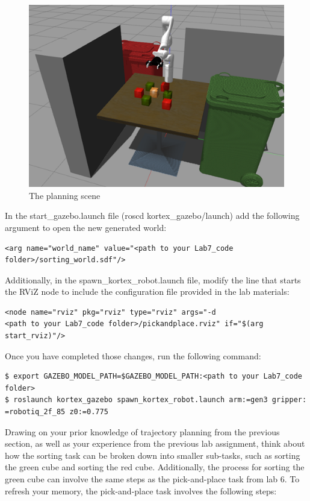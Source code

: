 \documentclass[12pt]{article}
\begin{document}
\begin{figure}[H]
    \vspace{-10pt}
    \centering\includegraphics[width=12cm]{images/lab73.png}\vspace{-10pt}
    \caption{The planning scene}\label{fig:planning}
    \end{figure}


In the start\_gazebo.launch file (roscd kortex\_gazebo/launch) add the following argument to open the new generated world:

\begin{verbatim}
<arg name="world_name" value="<path to your Lab7_code folder>/sorting_world.sdf"/>
\end{verbatim}

Additionally, in the spawn\_kortex\_robot.launch file, modify the line that starts the RViZ node to include the configuration file provided in the lab materials:

\begin{verbatim}
<node name="rviz" pkg="rviz" type="rviz" args="-d 
<path to your Lab7_code folder>/pickandplace.rviz" if="$(arg start_rviz)"/>
\end{verbatim}

Once you have completed those changes, run the following command:

\begin{verbatim}
$ export GAZEBO_MODEL_PATH=$GAZEBO_MODEL_PATH:<path to your Lab7_code folder>
$ roslaunch kortex_gazebo spawn_kortex_robot.launch arm:=gen3 gripper:
=robotiq_2f_85 z0:=0.775
\end{verbatim}

Drawing on your prior knowledge of trajectory planning from the previous section, as well as your experience from the previous lab assignment, think about how the sorting task can be broken down into smaller sub-tasks, such as sorting the green cube and sorting the red cube. Additionally, the process for sorting the green cube can involve the same steps as the pick-and-place task from lab 6. To refresh your memory, the pick-and-place task involves the following steps:
\end{document}
